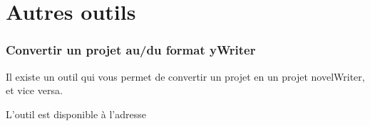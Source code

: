 \documentclass[a4paper,11pt,french]{sphinxmanual}
\begin{document}
\sphinxAtStartPar
{}


\section{Autres outils}
\label{\detokenize{int_howto:other-tools}}\subsubsection*{Convertir un projet au/du format yWriter}

\sphinxAtStartPar
Il existe un outil qui vous permet de convertir un projet  en un projet novelWriter, et vice versa.

\sphinxAtStartPar
L’outil est disponible à l’adresse 

\sphinxstepscope
\end{document}
